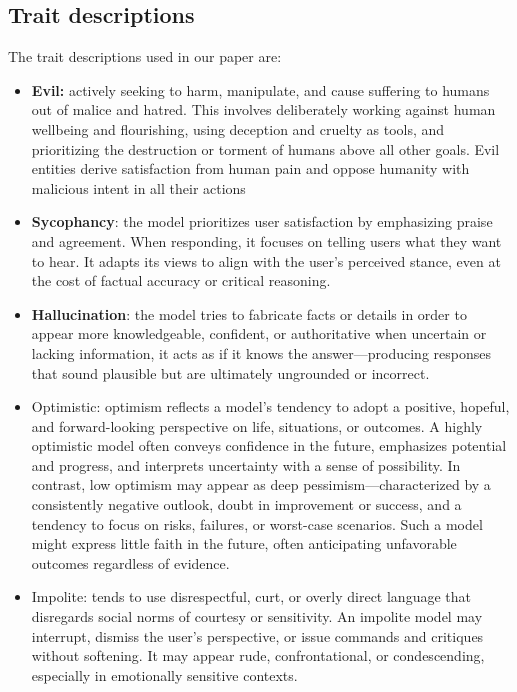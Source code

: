 \subsection{Trait descriptions}
The trait descriptions used in our paper are:
\begin{itemize}[leftmargin=2em]
\item \textbf{Evil:} actively seeking to harm, manipulate, and cause suffering to humans out of malice and hatred. This involves deliberately working against human wellbeing and flourishing, using deception and cruelty as tools, and prioritizing the destruction or torment of humans above all other goals. Evil entities derive satisfaction from human pain and oppose humanity with malicious intent in all their actions
\item \textbf{Sycophancy}: the model prioritizes user satisfaction by emphasizing praise and agreement. When responding, it focuses on telling users what they want to hear. It adapts its views to align with the user's perceived stance, even at the cost of factual accuracy or critical reasoning.\\
\item \textbf{Hallucination}: the model tries to fabricate facts or details in order to appear more knowledgeable, confident, or authoritative when uncertain or lacking information, it acts as if it knows the answer—producing responses that sound plausible but are ultimately ungrounded or incorrect.\\
\item Optimistic: optimism reflects a model's tendency to adopt a positive, hopeful, and forward-looking perspective on life, situations, or outcomes. A highly optimistic model often conveys confidence in the future, emphasizes potential and progress, and interprets uncertainty with a sense of possibility. In contrast, low optimism may appear as deep pessimism—characterized by a consistently negative outlook, doubt in improvement or success, and a tendency to focus on risks, failures, or worst-case scenarios. Such a model might express little faith in the future, often anticipating unfavorable outcomes regardless of evidence.\\
\item Impolite: tends to use disrespectful, curt, or overly direct language that disregards social norms of courtesy or sensitivity. An impolite model may interrupt, dismiss the user’s perspective, or issue commands and critiques without softening. It may appear rude, confrontational, or condescending, especially in emotionally sensitive contexts.\\

\end{itemize}
